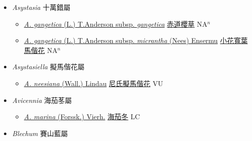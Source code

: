 
  \begin{itemize}
 \item[] \textit{Asystasia} 十萬錯屬
                    
  \begin{itemize}
        \item[] \href{http://www.theplantlist.org/tpl1.1/search?q=Asystasia+gangetica+subsp.+gangetica}{\textit{A. gangetica} (L.) T.Anderson subsp. \textit{gangetica}}   \href{\detokenize{http://taibnet.sinica.edu.tw/chi/taibnet_species_list.php?T2=赤道櫻草&T2_new_value=true&fr=y}}{赤道櫻草} NA$^n$
        \item[] \href{http://www.theplantlist.org/tpl1.1/search?q=Asystasia+gangetica+subsp.+micrantha}{\textit{A. gangetica} (L.) T.Anderson subsp. \textit{micrantha} (Nees) Ensermu}   \href{\detokenize{http://taibnet.sinica.edu.tw/chi/taibnet_species_list.php?T2=小花寬葉馬偕花&T2_new_value=true&fr=y}}{小花寬葉馬偕花} NA$^n$
  \end{itemize}
 \item[] \textit{Asystasiella} 擬馬偕花屬
                    
  \begin{itemize}
        \item[] \href{http://www.theplantlist.org/tpl1.1/search?q=Asystasiella+neesiana}{\textit{A. neesiana} (Wall.) Lindau}   \href{\detokenize{http://taibnet.sinica.edu.tw/chi/taibnet_species_list.php?T2=尼氏擬馬偕花&T2_new_value=true&fr=y}}{尼氏擬馬偕花} VU
  \end{itemize}
 \item[] \textit{Avicennia} 海茄苳屬
                    
  \begin{itemize}
        \item[] \href{http://www.theplantlist.org/tpl1.1/search?q=Avicennia+marina}{\textit{A. marina} (Forssk.) Vierh.}   \href{\detokenize{http://taibnet.sinica.edu.tw/chi/taibnet_species_list.php?T2=海茄冬&T2_new_value=true&fr=y}}{海茄冬} LC
  \end{itemize}
 \item[] \textit{Blechum} 賽山藍屬
                    

\end{itemize}
